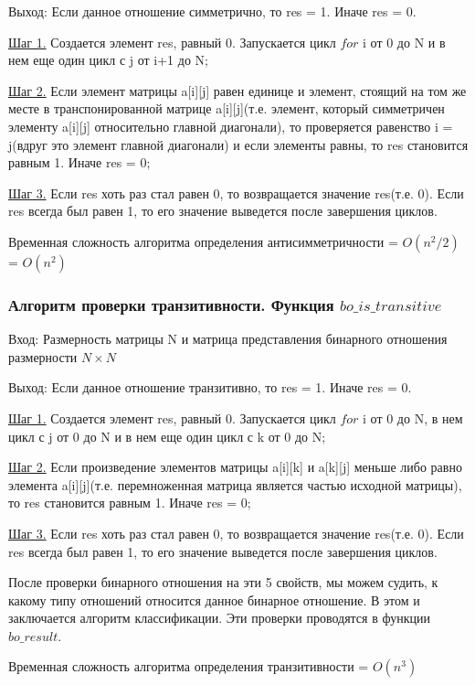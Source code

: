 \documentclass[bachelor, och, labwork]{shiza}
\begin{document}
	$\textit{Выход:}$  Если данное отношение симметрично, то res = 1. Иначе res = 0.
	
	\underline{Шаг 1.} Создается элемент res, равный 0. Запускается цикл $for$ i от 0 до N и в нем еще один цикл с j от i+1 до N;
	
	\underline{Шаг 2.} Если элемент матрицы a[i][j] равен единице и элемент, стоящий на том же месте в транспонированной матрице a[i][j](т.е. элемент, который симметричен элементу a[i][j] относительно главной диагонали), то проверяется равенство i = j(вдруг это элемент главной диагонали) и если элементы равны, то res становится равным 1. Иначе res = 0;
	
	\underline{Шаг 3.} Если res хоть раз стал равен 0, то возвращается значение res(т.е. 0). Если res всегда был равен 1, то его значение выведется после завершения циклов.
	
	Временная сложность алгоритма определения антисимметричности = $O(n^2/2)$ = $O(n^2)$
	
	\subsubsection{Алгоритм проверки транзитивности. Функция $bo\_is\_transitive$}

	$\textit{Вход:}$ Размерность матрицы N и матрица представления бинарного отношения размерности $N \times N$
	
	$\textit{Выход:}$  Если данное отношение транзитивно, то res = 1. Иначе res = 0.
	
	\underline{Шаг 1.} Создается элемент res, равный 0. Запускается цикл $for$ i от 0 до N, в нем цикл с j от 0 до N и в нем еще один цикл с k от 0 до N;
	
	\underline{Шаг 2.} Если произведение элементов матрицы a[i][k] и a[k][j] меньше либо равно элемента a[i][j](т.е. перемноженная матрица является частью исходной матрицы), то res становится равным 1. Иначе res = 0;
	
	\underline{Шаг 3.} Если res хоть раз стал равен 0, то возвращается значение res(т.е. 0). Если res всегда был равен 1, то его значение выведется после завершения циклов.
	
	После проверки бинарного отношения на эти 5 свойств, мы можем судить, к какому типу отношений относится данное бинарное отношение. В этом  и заключается алгоритм классификации. Эти проверки проводятся в функции $bo\_result$.
	
	Временная сложность алгоритма определения транзитивности = $O(n^3)$
		
\end{document}
